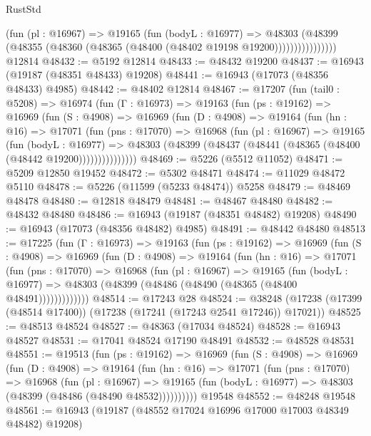 \begin{lexlean}{RustStd}
\begin{coremodule}
                    (fun (pl : @16967) =>
                    @19165
                      (fun (bodyL : @16977) =>
                      @48303
                        (@48399
                          (@48355 (@48360 (@48365 (@48400 (@48402 @19198 @19200))))))))))))))))
    @12814
@48432 := @5192 @12814
@48433 := @48432 @19200
@48437 := @16943 (@19187 (@48351 @48433) @19208)
@48441 := @16943 (@17073 (@48356 @48433) @4985)
@48442 := @48402 @12814
@48467 := @17207
    (fun (tail0 : @5208) =>
    @16974
      (fun (Γ : @16973) =>
      @19163
        (fun (ps : @19162) =>
        @16969
          (fun (S : @4908) =>
          @16969
            (fun (D : @4908) =>
            @19164
              (fun (hn : @16) =>
              @17071
                (fun (pns : @17070) =>
                @16968
                  (fun (pl : @16967) =>
                  @19165
                    (fun (bodyL : @16977) =>
                    @48303 (@48399 (@48437 (@48441 (@48365 (@48400 (@48442 @19200)))))))))))))))
@48469 := @5226 (@5512 @11052)
@48471 := @5209 @12850 @19452
@48472 := @5302 @48471
@48474 := @11029 @48472 @5110
@48478 := @5226 (@11599 (@5233 @48474)) @5258
@48479 := @48469 @48478
@48480 := @12818 @48479
@48481 := @48467 @48480
@48482 := @48432 @48480
@48486 := @16943 (@19187 (@48351 @48482) @19208)
@48490 := @16943 (@17073 (@48356 @48482) @4985)
@48491 := @48442 @48480
@48513 := @17225
    (fun (Γ : @16973) =>
    @19163
      (fun (ps : @19162) =>
      @16969
        (fun (S : @4908) =>
        @16969
          (fun (D : @4908) =>
          @19164
            (fun (hn : @16) =>
            @17071
              (fun (pns : @17070) =>
              @16968
                (fun (pl : @16967) =>
                @19165
                  (fun (bodyL : @16977) =>
                  @48303 (@48399 (@48486 (@48490 (@48365 (@48400 @48491)))))))))))))
@48514 := @17243 @28
@48524 := @38248 (@17238 (@17399 (@48514 @17400)) (@17238 (@17241 (@17243 @2541 @17246)) @17021))
@48525 := @48513 @48524
@48527 := @48363 (@17034 @48524)
@48528 := @16943 @48527
@48531 := @17041 @48524 @17190 @48491
@48532 := @48528 @48531
@48551 := @19513
    (fun (ps : @19162) =>
    @16969
      (fun (S : @4908) =>
      @16969
        (fun (D : @4908) =>
        @19164
          (fun (hn : @16) =>
          @17071
            (fun (pns : @17070) =>
            @16968
              (fun (pl : @16967) =>
              @19165 (fun (bodyL : @16977) => @48303 (@48399 (@48486 (@48490 @48532))))))))))
    @19548
@48552 := @48248 @19548
@48561 := @16943 (@19187 (@48552 @17024 @16996 @17000 @17003 @48349 @48482) @19208)

\end{coremodule}
\end{lexlean}
